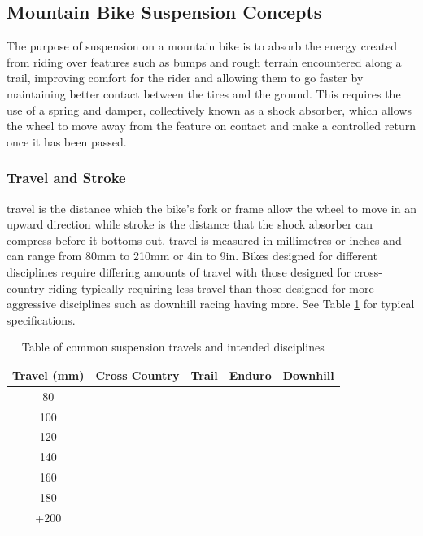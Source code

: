 	\subsection{Mountain Bike Suspension Concepts}
		The purpose of suspension on a mountain bike is to absorb the  energy created from riding over features such as bumps and rough terrain encountered along  a trail,  improving  comfort for the rider and allowing them to go faster by maintaining better contact between the tires and the ground. This requires the use of a spring and damper, collectively known as a shock absorber, which allows the wheel to move away from the feature on contact  and make a controlled return once it has been passed.
	\subsubsection{Travel and Stroke}
		\Gls{travel} is the distance which the bike’s fork or frame allow the wheel to move in an upward direction while \gls{stroke} is the distance that the shock absorber can compress before it bottoms out. \Gls{travel} is measured in millimetres or inches and can range from 80mm to 210mm or 4in to 9in. Bikes designed for different disciplines require differing amounts of travel with those designed for cross-country riding typically requiring less travel than those designed for more aggressive disciplines such as downhill racing having more. See Table \ref{tab:travel} for typical specifications.
		\begin{table}[h!]
		\centering
		\caption{Table of common suspension \glspl{travel} and intended disciplines}
		\label{tab:travel}
		\begin{tabular}{|c|cccc|}
			\hline
			Travel (mm)&Cross Country&Trail&Enduro&Downhill\\
			\hline
			80&\cellcolor[gray]{0.5}&&&
			\\
			100&\cellcolor[gray]{0.5}&&&
			\\
			120&\cellcolor[gray]{0.5}&\cellcolor[gray]{0.5}&&
			\\
			140&&\cellcolor[gray]{0.5}&\cellcolor[gray]{0.5}&
			\\
			160&&&\cellcolor[gray]{0.5}&
			\\
			180&&&\cellcolor[gray]{0.5}&\cellcolor[gray]{0.5}
			\\
			+200&&&&\cellcolor[gray]{0.5}\\
			\hline
		\end{tabular}
	\end{table}
